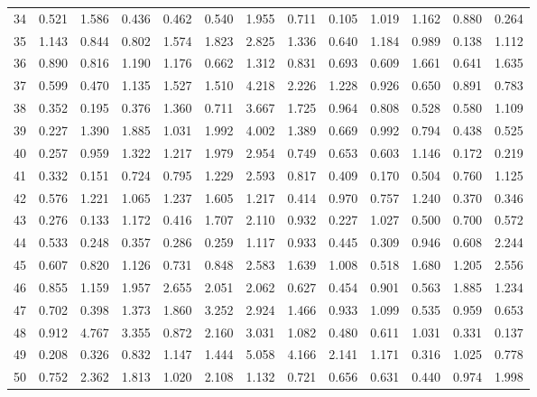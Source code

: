 \begin{tabular}{lrrrrrrrrrrrr}
34  &  0.521 &  1.586 &  0.436 &  0.462 &  0.540 &  1.955 &  0.711 &  0.105 &  1.019 &  1.162 &  0.880 &  0.264 \\
35  &  1.143 &  0.844 &  0.802 &  1.574 &  1.823 &  2.825 &  1.336 &  0.640 &  1.184 &  0.989 &  0.138 &  1.112 \\
36  &  0.890 &  0.816 &  1.190 &  1.176 &  0.662 &  1.312 &  0.831 &  0.693 &  0.609 &  1.661 &  0.641 &  1.635 \\
37  &  0.599 &  0.470 &  1.135 &  1.527 &  1.510 &  4.218 &  2.226 &  1.228 &  0.926 &  0.650 &  0.891 &  0.783 \\
38  &  0.352 &  0.195 &  0.376 &  1.360 &  0.711 &  3.667 &  1.725 &  0.964 &  0.808 &  0.528 &  0.580 &  1.109 \\
39  &  0.227 &  1.390 &  1.885 &  1.031 &  1.992 &  4.002 &  1.389 &  0.669 &  0.992 &  0.794 &  0.438 &  0.525 \\
40  &  0.257 &  0.959 &  1.322 &  1.217 &  1.979 &  2.954 &  0.749 &  0.653 &  0.603 &  1.146 &  0.172 &  0.219 \\
41  &  0.332 &  0.151 &  0.724 &  0.795 &  1.229 &  2.593 &  0.817 &  0.409 &  0.170 &  0.504 &  0.760 &  1.125 \\
42  &  0.576 &  1.221 &  1.065 &  1.237 &  1.605 &  1.217 &  0.414 &  0.970 &  0.757 &  1.240 &  0.370 &  0.346 \\
43  &  0.276 &  0.133 &  1.172 &  0.416 &  1.707 &  2.110 &  0.932 &  0.227 &  1.027 &  0.500 &  0.700 &  0.572 \\
44  &  0.533 &  0.248 &  0.357 &  0.286 &  0.259 &  1.117 &  0.933 &  0.445 &  0.309 &  0.946 &  0.608 &  2.244 \\
45  &  0.607 &  0.820 &  1.126 &  0.731 &  0.848 &  2.583 &  1.639 &  1.008 &  0.518 &  1.680 &  1.205 &  2.556 \\
46  &  0.855 &  1.159 &  1.957 &  2.655 &  2.051 &  2.062 &  0.627 &  0.454 &  0.901 &  0.563 &  1.885 &  1.234 \\
47  &  0.702 &  0.398 &  1.373 &  1.860 &  3.252 &  2.924 &  1.466 &  0.933 &  1.099 &  0.535 &  0.959 &  0.653 \\
48  &  0.912 &  4.767 &  3.355 &  0.872 &  2.160 &  3.031 &  1.082 &  0.480 &  0.611 &  1.031 &  0.331 &  0.137 \\
49  &  0.208 &  0.326 &  0.832 &  1.147 &  1.444 &  5.058 &  4.166 &  2.141 &  1.171 &  0.316 &  1.025 &  0.778 \\
50  &  0.752 &  2.362 &  1.813 &  1.020 &  2.108 &  1.132 &  0.721 &  0.656 &  0.631 &  0.440 &  0.974 &  1.998 \\

\end{tabular}
